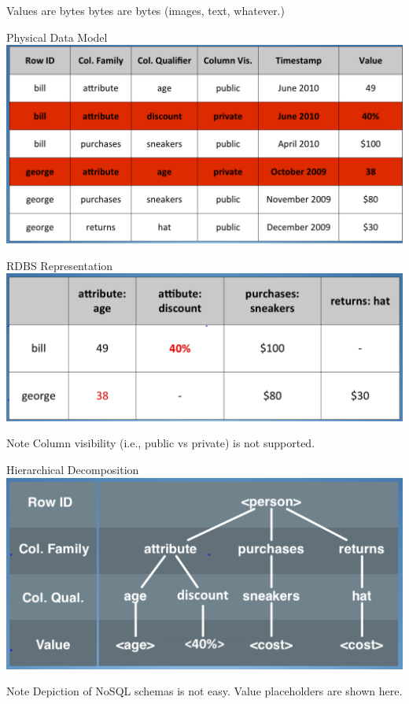 \documentclass[t,landscape]{beamer}
\begin{document}
\begin{frame}{Values are bytes}
bytes are bytes (images, text, whatever.)
\end{frame}

\begin{frame}{Physical Data Model}
\includegraphics[width=\textwidth]{images/physical_data_model_dmm.png}
\end{frame}

\begin{frame}{RDBS Representation}
\includegraphics[width=\textwidth]{images/2d_table_layout_dmm.png}
\begin{block}{Note}
Column visibility (i.e., public vs private) is not supported.
\end{block}
\end{frame}

\begin{frame}{Hierarchical Decomposition}
\includegraphics[width=\textwidth]{images/hierarchical_decomposition_dmm.png}
\begin{block}{Note}
Depiction of NoSQL schemas is not easy. Value placeholders are shown here.
\end{block}
\end{frame}
\end{document}
